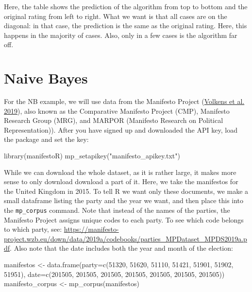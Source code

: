 \documentclass[
]{book}
\newenvironment{Shaded}{\begin{snugshade}}{\end{snugshade}}
\newcommand{\AttributeTok}[1]{\textcolor[rgb]{0.77,0.63,0.00}{#1}}
\newcommand{\DecValTok}[1]{\textcolor[rgb]{0.00,0.00,0.81}{#1}}
\newcommand{\FunctionTok}[1]{\textcolor[rgb]{0.00,0.00,0.00}{#1}}
\newcommand{\NormalTok}[1]{#1}
\newcommand{\OtherTok}[1]{\textcolor[rgb]{0.56,0.35,0.01}{#1}}
\newcommand{\StringTok}[1]{\textcolor[rgb]{0.31,0.60,0.02}{#1}}
\begin{document}
Here, the table shows the prediction of the algorithm from top to bottom and the original rating from left to right. What we want is that all cases are on the diagonal: in that case, the prediction is the same as the original rating. Here, this happens in the majority of cases. Also, only in a few cases is the algorithm far off.

\hypertarget{naive-bayes}{%
\section{Naive Bayes}\label{naive-bayes}}

For the NB example, we will use data from the Manifesto Project (\protect\hyperlink{ref-Volkens2019a}{Volkens et al. 2019}), also known as the Comparative Manifesto Project (CMP), Manifesto Research Group (MRG), and MARPOR (Manifesto Research on Political Representation)). After you have signed up and downloaded the API key, load the package and set the key:

\begin{Shaded}
\begin{Highlighting}[]
\FunctionTok{library}\NormalTok{(manifestoR)}
\FunctionTok{mp\_setapikey}\NormalTok{(}\StringTok{"manifesto\_apikey.txt"}\NormalTok{)}
\end{Highlighting}
\end{Shaded}

While we can download the whole dataset, as it is rather large, it makes more sense to only download download a part of it. Here, we take the manifestos for the United Kingdom in 2015. To tell R we want only these documents, we make a small dataframe listing the party and the year we want, and then place this into the \texttt{mp\_corpus} command. Note that instead of the names of the parties, the Manifesto Project assigns unique codes to each party. To see which code belongs to which party, see: \url{https://manifesto-project.wzb.eu/down/data/2019a/codebooks/parties_MPDataset_MPDS2019a.pdf}. Also note that the date includes both the year and month of the election:

\begin{Shaded}
\begin{Highlighting}[]
\NormalTok{manifestos }\OtherTok{\textless{}{-}} \FunctionTok{data.frame}\NormalTok{(}\AttributeTok{party=}\FunctionTok{c}\NormalTok{(}\DecValTok{51320}\NormalTok{, }\DecValTok{51620}\NormalTok{, }\DecValTok{51110}\NormalTok{, }\DecValTok{51421}\NormalTok{, }\DecValTok{51901}\NormalTok{, }\DecValTok{51902}\NormalTok{, }\DecValTok{51951}\NormalTok{), }\AttributeTok{date=}\FunctionTok{c}\NormalTok{(}\DecValTok{201505}\NormalTok{, }\DecValTok{201505}\NormalTok{, }\DecValTok{201505}\NormalTok{, }\DecValTok{201505}\NormalTok{, }\DecValTok{201505}\NormalTok{, }\DecValTok{201505}\NormalTok{, }\DecValTok{201505}\NormalTok{))}
\NormalTok{manifesto\_corpus }\OtherTok{\textless{}{-}} \FunctionTok{mp\_corpus}\NormalTok{(manifestos)}
\end{Highlighting}
\end{Shaded}
\end{document}
